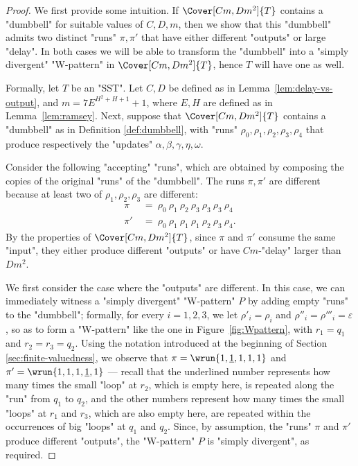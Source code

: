 \documentclass{theoretics}
\begin{document}
\begin{proof}
We first provide some intuition. 
If $\Cover[Cm,Dm^2]{T}$ contains a "dumbbell" for suitable values of $C,D,m$, then we show that
this "dumbbell" admits two distinct "runs" $\pi,\pi'$
that have either different "outputs" or  large "delay". 
In both cases we will be able to transform the "dumbbell" 
into a "simply divergent" "W-pattern" in $\Cover[Cm,Dm^2]{T}$, hence $T$ will have one as well.


Formally, let $T$ be an "SST". Let $C,D$ be defined 
as in Lemma~\ref{lem:delay-vs-output}, and
$m = 7E^{H^2 + H + 1} + 1$, where $E,H$ are 
defined as in Lemma~\ref{lem:ramsey}.
Next, suppose that $\Cover[Cm,Dm^2]{T}$ contains
a "dumbbell" as in Definition \ref{def:dumbbell}, 
with "runs" $\rho_0,\rho_1,\rho_2,\rho_3,\rho_4$
that produce respectively the "updates"
$\alpha,\beta,\gamma,\eta,\omega$. 

Consider the following "accepting" "runs", which are obtained
by composing the copies of the original "runs" of the "dumbbell". The runs $\pi, \pi'$ are different because at least two of $\rho_1,\rho_2,\rho_3$ are different:
\begin{equation}\label{eq:cover-runs}
\begin{aligned}
	\pi  &~=~  \rho_0 ~ \rho_1 ~ \rho_2 ~ \rho_3 ~ \rho_3 ~ \rho_3 ~ \rho_4\\
    \pi' &~=~ \rho_0 ~ \rho_1 ~ \rho_1 ~ \rho_1 ~ \rho_2 ~ \rho_3 ~ \rho_4.
\end{aligned}
\end{equation}
By the properties of $\Cover[Cm,Dm^2]{T}$, 
since $\pi$ and $\pi'$ consume the same "input",
they either produce different "outputs" or
have $Cm$-"delay" larger than $Dm^2$.

We first consider the case where the "outputs" are 
different. In this case, we can immediately
witness a "simply divergent" "W-pattern" $P$
by adding empty "runs" to the "dumbbell";
formally, for every $i=1,2,3$, we let 
$\rho'_i = \rho_i$ and $\rho''_i = \rho'''_i = \varepsilon$,
so as to form a "W-pattern" like the one in Figure~\ref{fig:Wpattern}, with
$r_1 = q_1$ and $r_2 = r_3 = q_2$.
Using the notation introduced at the beginning 
of Section \ref{sec:finite-valuedness}, we observe that 
$\pi  = \wrun{1,\underline{1},1,1,1}$ and 
$\pi' = \wrun{1,1,1,\underline{1},1}$
---
recall that the underlined number represents
how many times the small "loop" at $r_2$,
which is empty here, is repeated along the
"run" from $q_1$ to $q_2$, and the
other numbers represent how many times the small
"loops" at $r_1$ and $r_3$, which are also empty here,
are repeated within the occurrences of big "loops" 
at $q_1$ and $q_2$.
Since, by assumption, the "runs" $\pi$ and $\pi'$ 
produce different "outputs", the "W-pattern" $P$ 
is "simply divergent", as required.


\end{proof}
\end{document}
